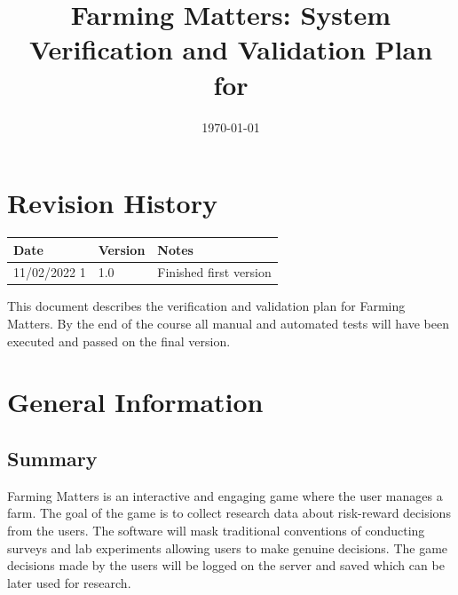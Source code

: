 \documentclass[12pt, titlepage]{article}
\begin{document}
\title{Farming Matters: System Verification and Validation Plan for \progname{}} 
\author{\authname}
\date{\today}
	
\maketitle


\section{Revision History}

\begin{tabularx}{\textwidth}{p{3cm}p{2cm}X}
\toprule {\bf Date} & {\bf Version} & {\bf Notes}\\
\midrule
11/02/2022 1 & 1.0 & Finished first version\\
\bottomrule
\end{tabularx}

\newpage

\tableofcontents

\listoftables

\listoffigures


\newpage


This document describes the verification and validation plan for Farming Matters. By the end of the course all manual and automated tests will have been executed and passed on the final version. 

\section{General Information}

\subsection{Summary}
Farming Matters is an interactive and engaging game where the user manages a farm. The goal of the game is to collect research data about risk-reward decisions from the users. The software will mask traditional conventions of conducting surveys and
lab experiments allowing users to make genuine decisions. The game decisions made by the users will be logged on the server and saved which can be later used for research.
\end{document}
